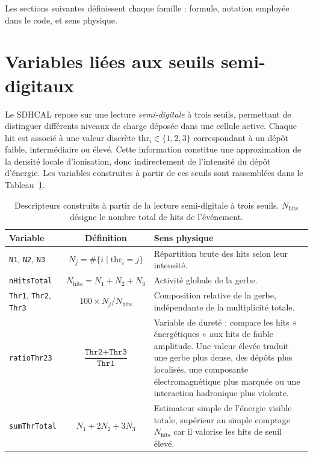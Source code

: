 Les sections suivantes définissent chaque famille : formule, notation employée dans le code, et sens physique.

\section{Variables liées aux seuils semi-digitaux}
\label{annexe:thrvars}

Le SDHCAL repose sur une lecture \emph{semi-digitale} à trois seuils, permettant de distinguer
différents niveaux de charge déposée dans une cellule active. Chaque hit est associé à une valeur
discrète \(\mathrm{thr}_i \in \{1,2,3\}\) correspondant à un dépôt faible, intermédiaire ou élevé.
Cette information constitue une approximation de la densité locale d'ionisation, donc indirectement
de l'intensité du dépôt d'énergie. Les variables construites à partir de ces seuils sont rassemblées
dans le Tableau~\ref{tab:annexeA-seuils}.

\begin{table}[!ht]
    \centering
    \caption{Descripteurs construits à partir de la lecture semi-digitale à trois seuils.
             \(N_{\mathrm{hits}}\) désigne le nombre total de hits de l'événement.}
    \label{tab:annexeA-seuils}
    \small
    \begin{tabularx}{\textwidth}{@{}l c X@{}}
        \toprule
        \textbf{Variable} & \textbf{Définition} & \textbf{Sens physique} \\
        \midrule
        \texttt{N1}, \texttt{N2}, \texttt{N3}
            & \(N_j = \#\{i \mid \mathrm{thr}_i = j\}\)
            & Répartition brute des hits selon leur intensité. \\[2pt]
        \texttt{nHitsTotal}
            & \(N_{\mathrm{hits}} = N_1 + N_2 + N_3\)
            & Activité globale de la gerbe. \\[2pt]
        \texttt{Thr1}, \texttt{Thr2}, \texttt{Thr3}
            & \(100 \times N_j / N_{\mathrm{hits}}\)
            & Composition relative de la gerbe, indépendante de la multiplicité totale. \\[2pt]
        \texttt{ratioThr23}
            & \(\dfrac{\texttt{Thr2}+\texttt{Thr3}}{\texttt{Thr1}}\)
            & Variable de dureté : compare les hits « énergétiques » aux hits de faible
              amplitude. Une valeur élevée traduit une gerbe plus dense, des dépôts plus
              localisés, une composante électromagnétique plus marquée ou une interaction
              hadronique plus violente. \\[2pt]
        \texttt{sumThrTotal}
            & \(N_1 + 2N_2 + 3N_3\)
            & Estimateur simple de l'énergie visible totale, supérieur au simple comptage
              \(N_{\mathrm{hits}}\) car il valorise les hits de seuil élevé. \\
        \bottomrule
    \end{tabularx}
\end{table}

